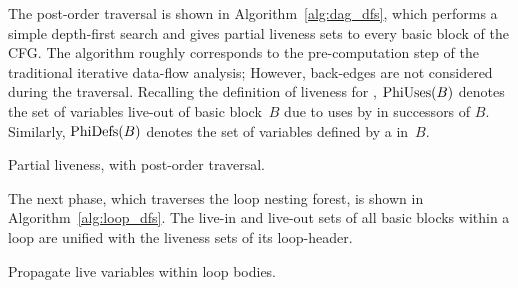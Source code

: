The post-order traversal is shown in Algorithm~\ref{alg:dag_dfs}, which performs a simple depth-first search and gives partial liveness sets to every basic block of the CFG.
The algorithm roughly corresponds to the pre-computation step of the traditional iterative data-flow analysis;
However, back-edges are not considered during the traversal.
Recalling the definition of liveness for \phifuns, $\textrm{PhiUses}(B)$ denotes the set of variables live-out of basic block~$B$ due to uses by \phifuns in successors of $B$.
Similarly, $\textrm{PhiDefs}(B)$ denotes the set of variables defined by a \phifun in~$B$.

\medskip
\begin{algorithm}[H]
  \caption{Partial liveness, with post-order traversal.}
  \label{alg:dag_dfs}
\end{algorithm}
\medskip

The next phase, which traverses the loop nesting forest, is shown in Algorithm~\ref{alg:loop_dfs}.
The live-in and live-out sets of all basic blocks within a loop are unified with the liveness sets of its loop-header.

\medskip
\begin{algorithm}[H]
  \caption{Propagate live variables within loop bodies.}
  \label{alg:loop_dfs}
\end{algorithm}
\medskip


